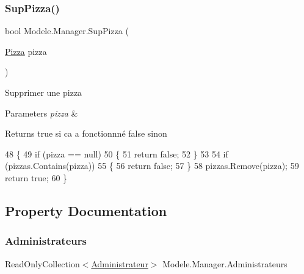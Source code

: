 \subsubsection{\texorpdfstring{Sup\+Pizza()}{SupPizza()}}
{\footnotesize\ttfamily bool Modele.\+Manager.\+Sup\+Pizza (\begin{DoxyParamCaption}\item[{\hyperlink{classModele_1_1Pizza}{Pizza}}]{pizza }\end{DoxyParamCaption})\hspace{0.3cm}{\ttfamily [inline]}}



Supprimer une pizza 


\begin{DoxyParams}{Parameters}
{\em pizza} & \\
\hline
\end{DoxyParams}
\begin{DoxyReturn}{Returns}
true si ca a fonctionnné false sinon
\end{DoxyReturn}

\begin{DoxyCode}
48         \{
49             \textcolor{keywordflow}{if} (pizza == null)
50             \{
51                 \textcolor{keywordflow}{return} \textcolor{keyword}{false};
52             \}
53 
54             \textcolor{keywordflow}{if} (pizzas.Contains(pizza))
55             \{
56                 \textcolor{keywordflow}{return} \textcolor{keyword}{false};
57             \}
58             pizzas.Remove(pizza);
59             \textcolor{keywordflow}{return} \textcolor{keyword}{true};
60         \}
\end{DoxyCode}


\subsection{Property Documentation}
\mbox{\label{classModele_1_1Manager_ac8440a9781b104ad429965fcd460bf2f}} 
\subsubsection{\texorpdfstring{Administrateurs}{Administrateurs}}
{\footnotesize\ttfamily Read\+Only\+Collection$<$\hyperlink{classModele_1_1Administrateur}{Administrateur}$>$ Modele.\+Manager.\+Administrateurs\hspace{0.3cm}{\ttfamily [get]}}



